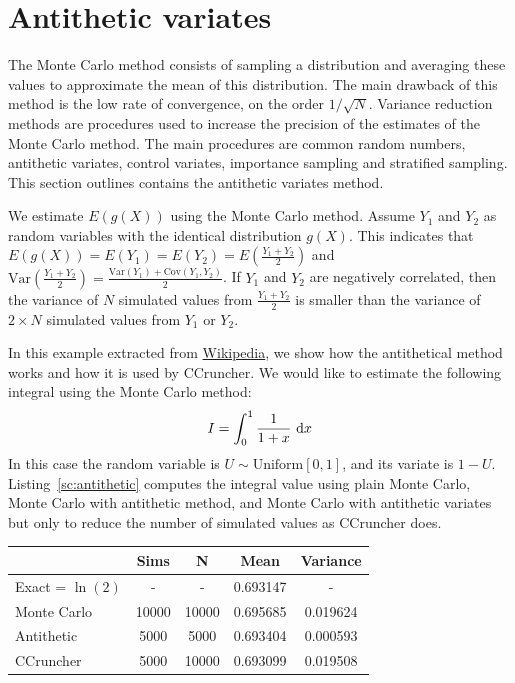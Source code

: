 \documentclass[11pt,fleqn]{book} %
\begin{document}
\section{Antithetic variates}
\label{ap:vr}

The Monte Carlo method consists of sampling a distribution and averaging 
these values to approximate the mean of this distribution. The main drawback 
of this method is the low rate of convergence, on the order $1/\sqrt{N}$.
Variance reduction methods are procedures used to increase the precision 
of the estimates of the Monte Carlo method. The main procedures are common 
random numbers, antithetic variates, control variates, importance sampling 
and stratified sampling. This section outlines contains the antithetic 
variates method.

We estimate $E(g(X))$ using the Monte Carlo method. Assume $Y_1$ and 
$Y_2$ as random variables with the identical distribution $g(X)$. 
This indicates that $E(g(X)) = E(Y_1) = E(Y_2) = E(\frac{Y_1+Y_2}{2})$ and
$\text{Var}\left(\frac{Y_1+Y_2}{2}\right) = 
\frac{\text{Var}(Y_1)+\text{Cov}(Y_1,Y_2)}{2}$.
If $Y_1$ and $Y_2$ are negatively correlated, then the variance of $N$ 
simulated values from $\frac{Y_1+Y_2}{2}$ is smaller than the variance 
of $2{\times}N$ simulated values from $Y_1$ or $Y_2$.

\begin{example}
	In this example extracted from 
	\href{http://en.wikipedia.org/wiki/Antithetic_variates}{Wikipedia}, we 
	show how the antithetical method works and how it is used by CCruncher. 
	We would like to estimate the following integral using the Monte Carlo 
	method:
	\begin{displaymath}
		I = \displaystyle \int_0^1 \frac{1}{1+x} \mathop{\,\mathrm{{}d}}\mathopen{} x
	\end{displaymath}
	In this case the random variable is $U \sim \text{Uniform}[0,1]$, and 
	its variate is $1-U$. Listing~\ref{sc:antithetic} computes the integral 
	value using plain Monte Carlo, Monte Carlo with antithetic method, and 
	Monte Carlo with antithetic variates but only to reduce the number of 
	simulated values as CCruncher does.
	\\
	\hspace*{1cm}
	\begin{tabular}{l|c|c|c|c|}
		\cline{2-5}
		& Sims & N & Mean & Variance \\
		\hline
		\multicolumn{1}{|l|}{Exact = $\ln(2)$} & - & - & 0.693147 & - \\
		\hline
		\multicolumn{1}{|l|}{Monte Carlo} & 10000 & 10000 & 0.695685 & 0.019624 \\
		\hline
		\multicolumn{1}{|l|}{Antithetic} & 5000 & 5000 & 0.693404 & 0.000593 \\
		\hline
		\multicolumn{1}{|l|}{CCruncher} & 5000 & 10000 & 0.693099 & 0.019508 \\
		\hline
	\end{tabular}
\end{example}
\end{document}
